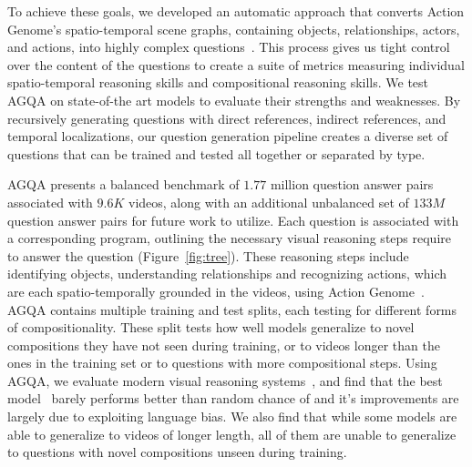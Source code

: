 To achieve these goals, we developed an automatic approach that converts Action Genome’s spatio-temporal scene graphs, containing objects, relationships, actors, and actions, into highly complex questions~\cite{ji2020action}. This process gives us tight control over the content of the questions to create a suite of metrics measuring individual spatio-temporal reasoning skills and compositional reasoning skills. We test AGQA on state-of-the art models to evaluate their strengths and weaknesses. 
By recursively generating questions with direct references, indirect references, and temporal localizations, our question generation pipeline creates a diverse set of questions that can be trained and tested all together or separated by type.


AGQA presents a balanced benchmark of $1.77$ million question answer pairs associated with $9.6K$ videos, along with an additional unbalanced set of $133M$ question answer pairs for future work to utilize. Each question is associated with a corresponding program, outlining the necessary visual reasoning steps require to answer the question (Figure~\ref{fig:tree}). These reasoning steps include identifying objects, understanding relationships and recognizing actions, which are each spatio-temporally grounded in the videos, using Action Genome~\cite{ji2020action}. AGQA contains multiple training and test splits, each testing for different forms of compositionality. These split tests how well models generalize to novel compositions they have not seen during training, or to videos longer than the ones in the training set or to questions with more compositional steps. Using AGQA, we evaluate modern visual reasoning systems~\cite{fan2019heterogeneous, le2020hierarchical, li2019beyond}, and find that the best model~\cite{} barely performs better than random chance of and it's improvements are largely due to exploiting language bias. We also find that while some models are able to generalize to videos of longer length, all of them are unable to generalize to questions with novel compositions unseen during training.



